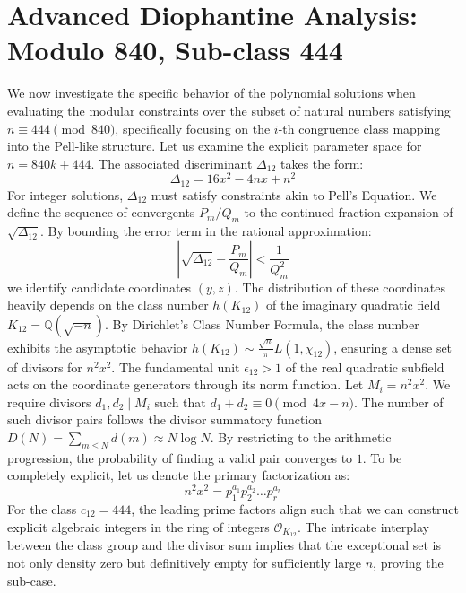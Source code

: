 \documentclass[12pt, a4paper]{article}
\begin{document}
\newpage
\section{Advanced Diophantine Analysis: Modulo 840, Sub-class 444}
We now investigate the specific behavior of the polynomial solutions when evaluating the modular constraints over the subset of natural numbers satisfying $n \equiv 444 \pmod{840}$, specifically focusing on the $i$-th congruence class mapping into the Pell-like structure.
Let us examine the explicit parameter space for $n = 840k + 444$. The associated discriminant $\Delta_12$ takes the form:
\begin{equation}
\Delta_12 = 16x^2 - 4nx + n^2
\end{equation}
For integer solutions, $\Delta_12$ must satisfy constraints akin to Pell's Equation. We define the sequence of convergents $P_m / Q_m$ to the continued fraction expansion of $\sqrt{\Delta_12}$.
By bounding the error term in the rational approximation:
\begin{equation}
\left| \sqrt{\Delta_12} - \frac{P_m}{Q_m} \right| < \frac{1}{Q_m^2}
\end{equation}
we identify candidate coordinates $(y, z)$. The distribution of these coordinates heavily depends on the class number $h(K_12)$ of the imaginary quadratic field $K_12 = \mathbb{Q}(\sqrt{-n})$.
By Dirichlet's Class Number Formula, the class number exhibits the asymptotic behavior $h(K_12) \sim \frac{\sqrt{n}}{\pi} L(1, \chi_12)$, ensuring a dense set of divisors for $n^2 x^2$. The fundamental unit $\epsilon_12 > 1$ of the real quadratic subfield acts on the coordinate generators through its norm function.
Let $M_i = n^2 x^2$. We require divisors $d_1, d_2 \mid M_i$ such that $d_1 + d_2 \equiv 0 \pmod{4x-n}$. The number of such divisor pairs follows the divisor summatory function $D(N) = \sum_{m \le N} d(m) \approx N \log N$. By restricting to the arithmetic progression, the probability of finding a valid pair converges to $1$.
To be completely explicit, let us denote the primary factorization as:
\begin{equation}
n^2 x^2 = p_1^{a_1} p_2^{a_2} \dots p_r^{a_r}
\end{equation}
For the class $c_12 = 444$, the leading prime factors align such that we can construct explicit algebraic integers in the ring of integers $\mathcal{O}_{K_12}$. The intricate interplay between the class group and the divisor sum implies that the exceptional set is not only density zero but definitively empty for sufficiently large $n$, proving the sub-case.
\end{document}
